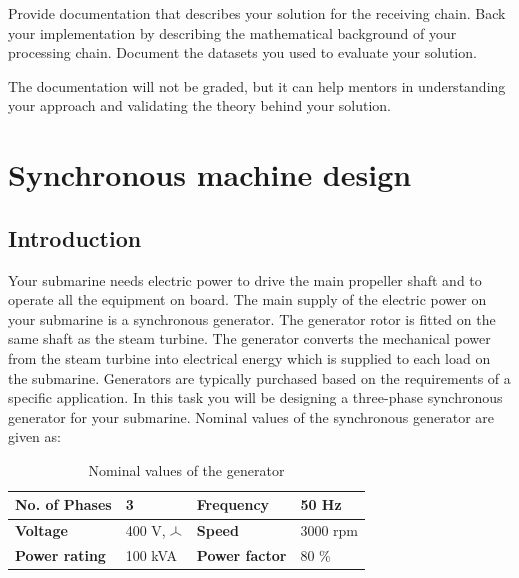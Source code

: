 \documentclass[openany]{book}
\newcommand{\wye}{\mathbin{\tikz[x=1ex,y=1ex]{\draw[line width=.1ex] 
(0,0)--(30:1)--++(-30:1) (30:1)--++(0,1);}}}
\begin{document}
	Provide documentation that describes your solution for the receiving chain. 
	Back your implementation by describing the mathematical background of your 
	processing chain. Document the datasets you used to evaluate your solution.
	
	The documentation will not be graded, but it can help mentors in 
	understanding your approach and validating the theory behind your solution.
	
	\newpage
	\section{Synchronous machine design}
	
	\subsection{Introduction}
	
	Your submarine needs electric power to drive the main propeller shaft and 
	to operate all the equipment on board. The main supply of the electric 
	power on your submarine is a synchronous generator. The generator rotor is 
	fitted on the same shaft as the steam turbine. The generator converts the 
	mechanical power from the steam turbine into electrical energy which is 
	supplied to each load on the submarine. Generators are typically purchased 
	based on the requirements of a specific application. In this task you will 
	be designing a three-phase synchronous generator for your submarine. 
	Nominal values of the synchronous generator are given as: 
	\begin{table}[h!]
		\caption{Nominal values of the generator}
		\label{tab:nominalValues}
		\begin{tabularx}{\textwidth}{|Y|Y|Y|Y|} \hline
			\textbf{No. of Phases} & 3 & \textbf{Frequency} & 50 Hz \\ \hline 
			\textbf{Voltage} & 400 V, {\Large $\wye$} & \textbf{Speed} & 3000 
			rpm \\ \hline
			\textbf{Power rating} & 100 kVA & \textbf{Power factor} & 80 \% \\ 
			\hline
		\end{tabularx}
	\end{table}
	
\end{document}
